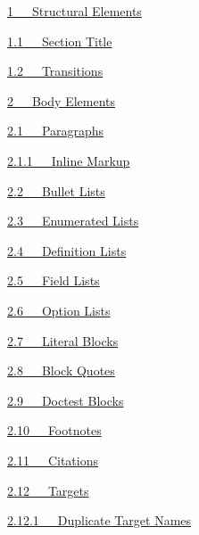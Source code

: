 \documentclass[10pt,english]{article}
\begin{document}
\begin{list}{}{}
\item {} \href{\#structural-elements}{1~~~Structural Elements}
\begin{list}{}{}
\item {} \href{\#section-title}{1.1~~~Section Title}

\item {} \href{\#transitions}{1.2~~~Transitions}

\end{list}

\item {} \href{\#body-elements}{2~~~Body Elements}
\begin{list}{}{}
\item {} \href{\#paragraphs}{2.1~~~Paragraphs}
\begin{list}{}{}
\item {} \href{\#inline-markup}{2.1.1~~~Inline Markup}

\end{list}

\item {} \href{\#bullet-lists}{2.2~~~Bullet Lists}

\item {} \href{\#enumerated-lists}{2.3~~~Enumerated Lists}

\item {} \href{\#definition-lists}{2.4~~~Definition Lists}

\item {} \href{\#field-lists}{2.5~~~Field Lists}

\item {} \href{\#option-lists}{2.6~~~Option Lists}

\item {} \href{\#literal-blocks}{2.7~~~Literal Blocks}

\item {} \href{\#block-quotes}{2.8~~~Block Quotes}

\item {} \href{\#doctest-blocks}{2.9~~~Doctest Blocks}

\item {} \href{\#footnotes}{2.10~~~Footnotes}

\item {} \href{\#citations}{2.11~~~Citations}

\item {} \href{\#targets}{2.12~~~Targets}
\begin{list}{}{}
\item {} \href{\#duplicate-target-names}{2.12.1~~~Duplicate Target Names}


\end{list}
\end{list}
\end{list}
\end{document}
